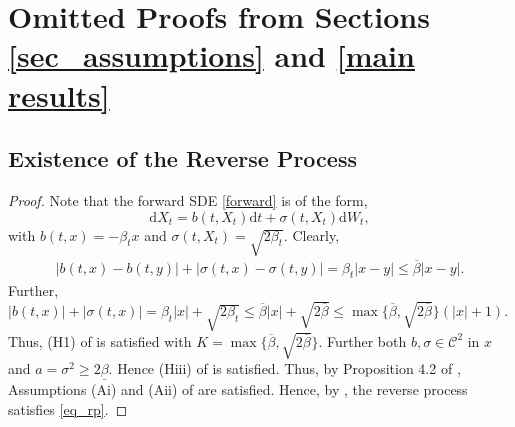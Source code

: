 \documentclass[12pts]{article}
\newcommand{\diff}{\mathrm{d}}
\begin{document}
\section{Omitted Proofs from Sections \ref{sec_assumptions} and \ref{main results}}
\subsection{Existence of the Reverse Process}
\proptwo*
\begin{proof}
    Note that the forward SDE \eqref{forward} is of the form, 
    \[\diff X_t = b(t, X_t) \diff t + \sigma(t, X_t) \diff W_t, \]
    with $b(t, x) = -\beta_t x$ and $\sigma(t, X_t) = \sqrt{2 \beta_t}$.  Clearly, 
    \begin{align*}
        |b(t, x) - b(t, y)| + |\sigma(t,x) - \sigma(t,y)| = \beta_t |x-y| \le \overline{\beta} |x-y|.
    \end{align*}
    Further, $|b(t,x)| + |\sigma(t,x)| = \beta_t |x| + \sqrt{2\beta_t} \le \overline{\beta} |x| + \sqrt{2\overline{\beta}} \le \max\{\overline{\beta}, \sqrt{2 \overline{\beta}} \}(|x| +1)$. Thus, (H1) of \citep{10.1214/aop/1176991505} is satisfied with $K =  \max\{\overline{\beta}, \sqrt{2 \overline{\beta}} \} $. Further both $b, \sigma \in \mathscr{C}^2$ in $x$ and $a = \sigma^2 \ge 2 \underline{\beta}$. Hence (Hiii) of \citep{10.1214/aop/1176991505} is satisfied. Thus, by Proposition 4.2 of \citep{10.1214/aop/1176991505}, Assumptions (Ai) and (Aii) of \citep{10.1214/aop/1176991505} are satisfied. Hence, by \citet[Theorem~2.3]{10.1214/aop/1176991505}, the reverse process satisfies \eqref{eq_rp}.
\end{proof}
\end{document}
